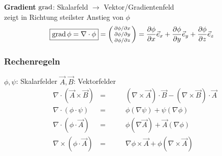 \textbf{Gradient} $\operatorname{grad}$: Skalarfeld $\rightarrow$ Vektor/Gradientenfeld\\ 
\small{zeigt in Richtung steilster Anstieg von $\phi$}
\begin{align*}                                                                                          
    \boxed{\operatorname{grad} \phi = \nabla \cdot \phi }=  
    \begin{psmallmatrix}
        \partial \phi / \partial x \\
        \partial \phi / \partial y \\
        \partial \phi / \partial z
    \end{psmallmatrix}
    = \dfrac{\partial \phi}{\partial x} \vec{e}_x + \dfrac{\partial \phi}{\partial y} \vec{e}_y + 
    \dfrac{\partial \phi}{\partial z} \vec{e}_z  
\end{align*}

\subsubsection{Rechenregeln}
$\phi, \psi$: Skalarfelder \qquad $\vec{A}, \vec{B}$: Vektorfelder
\begin{align*}
     & \nabla \cdot (\vec{A} \times \vec{B}) & = & \qquad (\nabla \times \vec{A})\cdot\vec{B} - (\nabla\times\vec{B})\cdot\vec{A} \\
     & \nabla \cdot (\phi \cdot \psi)        & = & \qquad \phi (\nabla \psi) + \psi( \nabla \phi)                                  \\
     & \nabla \cdot (\phi \cdot \vec{A})           & = & \qquad \phi (\nabla \vec{A}) + \vec{A}(\nabla \phi)                             \\
     & \nabla \times (\phi \cdot \vec{A})          & = & \qquad \nabla \phi \times \vec{A} + \phi (\nabla \times \vec{A})                        
\end{align*}

